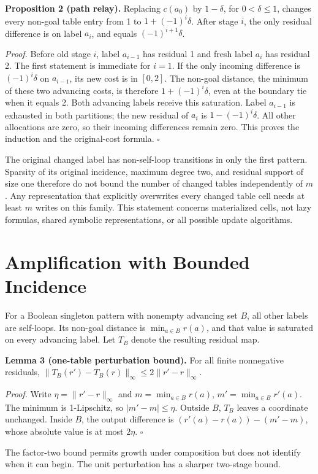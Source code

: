 \textbf{Proposition 2 (path relay).} Replacing $c(a_0)$ by $1-\delta$, for $0<\delta\leq1$, changes every non-goal table entry from 1 to $1+(-1)^i\delta$. After stage $i$, the only residual difference is on label $a_i$, and equals $(-1)^{i+1}\delta$.

\textit{Proof.} Before old stage $i$, label $a_{i-1}$ has residual 1 and fresh label $a_i$ has residual 2. The first statement is immediate for $i=1$. If the only incoming difference is $(-1)^i\delta$ on $a_{i-1}$, its new cost is in $[0,2]$. The non-goal distance, the minimum of these two advancing costs, is therefore $1+(-1)^i\delta$, even at the boundary tie when it equals 2. Both advancing labels receive this saturation. Label $a_{i-1}$ is exhausted in both partitions; the new residual of $a_i$ is $1-(-1)^i\delta$. All other allocations are zero, so their incoming differences remain zero. This proves the induction and the original-cost formula. $\square$

The original changed label has non-self-loop transitions in only the first pattern. Sparsity of its original incidence, maximum degree two, and residual support of size one therefore do not bound the number of changed tables independently of $m$. Any representation that explicitly overwrites every changed table cell needs at least $m$ writes on this family. This statement concerns materialized cells, not lazy formulas, shared symbolic representations, or all possible update algorithms.

\section{Amplification with Bounded Incidence}
For a Boolean singleton pattern with nonempty advancing set $B$, all other labels are self-loops. Its non-goal distance is $\min_{a\in B}r(a)$, and that value is saturated on every advancing label. Let $T_B$ denote the resulting residual map.

\textbf{Lemma 3 (one-table perturbation bound).} For all finite nonnegative residuals, $\lVert T_B(r')-T_B(r)\rVert_\infty\leq2\lVert r'-r\rVert_\infty$.

\textit{Proof.} Write $\eta=\lVert r'-r\rVert_\infty$ and $m=\min_{a\in B}r(a)$, $m'=\min_{a\in B}r'(a)$. The minimum is 1-Lipschitz, so $|m'-m|\leq\eta$. Outside $B$, $T_B$ leaves a coordinate unchanged. Inside $B$, the output difference is $(r'(a)-r(a))-(m'-m)$, whose absolute value is at most $2\eta$. $\square$

The factor-two bound permits growth under composition but does not identify when it can begin. The unit perturbation has a sharper two-stage bound.

